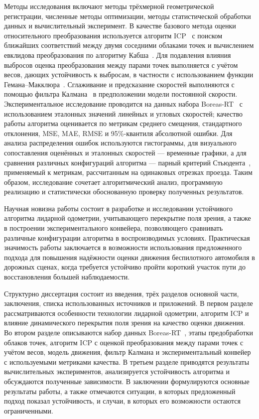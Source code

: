 Методы исследования включают методы трёхмерной геометрической регистрации, численные методы оптимизации, методы статистической обработки данных и вычислительный эксперимент. В качестве базового метода оценки относительного преобразования используется алгоритм ICP~\cite{icp-learnopencv} с поиском ближайших соответствий между двумя соседними облаками точек и вычислением евклидова преобразования по алгоритму Кабша~\cite{kabsch-wikipedia,kabsch-nghiaho}. Для подавления влияния выбросов оценка преобразования между парами точек выполняется с учётом весов, дающих устойчивость к выбросам, в частности с использованием функции Гемана--Макклюра~\cite{kiss-icp}. Сглаживание и предсказание скоростей выполняются с помощью фильтра Калмана~\cite{habr-kalman-pictures} в предположении модели постоянной скорости. Экспериментальное исследование проводится на данных набора Boreas-RT~\cite{boreas-road-trip} с использованием эталонных значений линейных и угловых скоростей; качество работы алгоритма оценивается по метрикам среднего смещения, стандартного отклонения, MSE, MAE, RMSE и 95\%-квантиля абсолютной ошибки. Для анализа распределения ошибок используются гистограммы, для визуального сопоставления оценённых и эталонных скоростей --- временные графики, а для сравнения различных конфигураций алгоритма --- парный критерий Стьюдента~\cite{student-yandex-practicum,student-t-test-habr}, применяемый к метрикам, рассчитанным на одинаковых отрезках проезда. Таким образом, исследование сочетает алгоритмический анализ, программную реализацию и статистически обоснованную проверку полученных результатов.

Научная новизна работы состоит в разработке и исследовании устойчивого алгоритма лидарной одометрии, учитывающего перекрытие поля зрения, а также в построении экспериментального конвейера, позволяющего сравнивать различные конфигурации алгоритма в воспроизводимых условиях. Практическая значимость работы заключается в возможности использования предложенного подхода для повышения надёжности оценки движения беспилотного автомобиля в дорожных сценах, когда требуется устойчиво пройти короткий участок пути до восстановления большей наблюдаемости.

Структурно диссертация состоит из введения, трёх разделов основной части, заключения, списка использованных источников и приложений. В первом разделе рассматриваются особенности технологии лидарной одометрии, алгоритм ICP и влияние динамического перекрытия поля зрения на качество оценки движения. Во втором разделе описываются набор данных Boreas-RT~\cite{boreas-road-trip}, этапы предобработки облаков точек, алгоритм ICP с оценкой преобразования между парами точек с учётом весов, модель движения, фильтр Калмана и экспериментальный конвейер с используемыми метриками качества. В третьем разделе приводятся результаты вычислительных экспериментов, анализируется устойчивость алгоритма и обсуждаются полученные зависимости. В заключении формулируются основные результаты работы, а также отмечаются ситуации, в которых предложенный подход показал устойчивость, и случаи, в которых его возможности остаются ограниченными.

